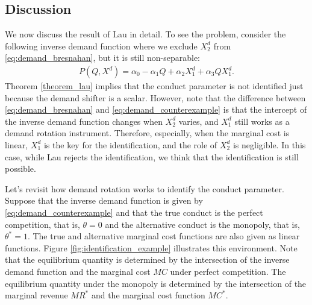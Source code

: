 \documentclass[11pt, a4paper]{article}
\theoremstyle{remark}
\begin{document}
\subsection{Discussion}\label{subsec:lau_discussion}
We now discuss the result of Lau in detail.
To see the problem, consider the following inverse demand function where we exclude $X^{d}_2$ from \eqref{eq:demand_bresnahan}, but it is still non-separable:
\begin{align}
    P(Q, X^{d}) = \alpha_0 - \alpha_1Q + \alpha_2X^{d}_1 + \alpha_3QX^{d}_1. \label{eq:demand_counterexample}
\end{align}
Theorem \ref{theorem_lau} implies that the conduct parameter is not identified just because the demand shifter is a scalar.
However, note that the difference between \eqref{eq:demand_bresnahan} and \eqref{eq:demand_counterexample} is that the intercept of the inverse demand function changes when $X^{d}_2$ varies, and  $X^{d}_1$ still works as a demand rotation instrument.
Therefore, especially, when the marginal cost is linear, $X^{d}_1$ is the key for the identification, and the role of $X^{d}_2$ is negligible. 
In this case, while Lau rejects the identification, we think that the identification is still possible.

Let's revisit how demand rotation works to identify the conduct parameter.
Suppose that the inverse demand function is given by \eqref{eq:demand_counterexample} and that the true conduct is the perfect competition, that is, $\theta = 0$ and the alternative conduct is the monopoly, that is, $\theta^{*} = 1$.
The true and alternative marginal cost functions are also given as linear functions.
Figure \ref{fig:identification_example} illustrates this environment.
Note that the equilibrium quantity is determined by the intersection of the inverse demand function and the marginal cost $MC$ under perfect competition.
The equilibrium quantity under the monopoly is determined by the intersection of the marginal revenue $MR^{*}$ and the marginal cost function $MC^{*}$.
\end{document}
